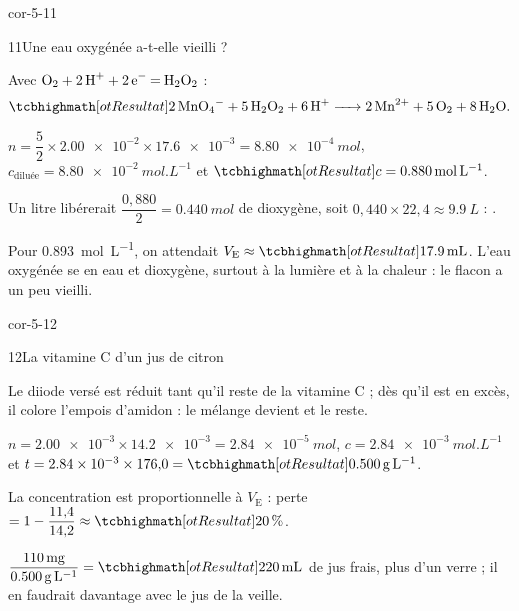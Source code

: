 \begin{blocLivre}{cor-5-11}
\begin{corrige}{11}{Une eau oxygénée a-t-elle vieilli ?}
\begin{questions}
\item Avec $\ce{O2 + 2H+ + 2e- = H2O2}$ :
\[\res{\ce{2MnO4- + 5H2O2 + 6H+ -> 2Mn^{2+} + 5O2 + 8H2O}}.\]
\item $n=\dfrac{5}{2}\times\num{2.00e-2}\times\num{17.6e-3}=\qty{8,80e-4}{mol}$, $c_\text{diluée}=\qty{8,80e-2}{mol.L^{-1}}$ et $\res{c=\qty{0,880}{mol.L^{-1}}}$.
\item Un litre libérerait $\dfrac{0{,}880}{2}=\qty{0,440}{mol}$ de dioxygène, soit $0{,}440\times22{,}4\approx\qty{9,9}{L}$ : .
\item Pour \qty{0,893}{mol.L^{-1}}, on attendait $V_\mathrm{E}\approx\res{\qty{17,9}{mL}}$. L'eau oxygénée se  en eau et
dioxygène, surtout à la lumière et à la chaleur : le flacon a un peu vieilli.
\end{questions}
\end{corrige}
\end{blocLivre}
\begin{blocLivre}{cor-5-12}
\begin{corrige}{12}{La vitamine C d'un jus de citron}
\begin{questions}
\item Le diiode versé est réduit tant qu'il reste de la vitamine C ; dès qu'il est en excès, il colore l'empois d'amidon : le
mélange devient  et le reste.
\item $n=\num{2.00e-3}\times\num{14.2e-3}=\qty{2,84e-5}{mol}$, $c=\qty{2,84e-3}{mol.L^{-1}}$ et $t=\num{2.84e-3}\times176{,}0=\res{\qty{0,500}{g.L^{-1}}}$.
\item La concentration est proportionnelle à $V_\mathrm{E}$ : perte $=1-\dfrac{11{,}4}{14{,}2}\approx\res{\qty{20}{\percent}}$.
\item $\dfrac{\qty{110}{mg}}{\qty{0,500}{g.L^{-1}}}=\res{\qty{220}{mL}}$ de jus frais, plus d'un verre ; il en faudrait davantage avec le jus de la veille.
\end{questions}
\end{corrige}
\end{blocLivre}
